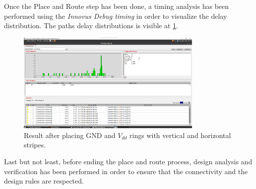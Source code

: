 Once the Place and Route step has been done, a timing analysis has been performed using the \textit{Innovus Debug timing} in order to visualize the delay distribution. The paths delay distributions is visible at \ref{fig:innovus_delay}.
\begin{figure}[h]   
    \centering
    \includegraphics[width=0.8\textwidth]{chapters/9_PhysicalDesign/images/innvous_delay.png}
    \caption{Result after placing GND and $V_{dd}$ rings with vertical and horizontal stripes.}
    \label{fig:innovus_delay}
\end{figure}

Last but not least, before ending the place and route process, design analysis and verification has been performed in order to ensure that the connectivity and the design rules are respected.